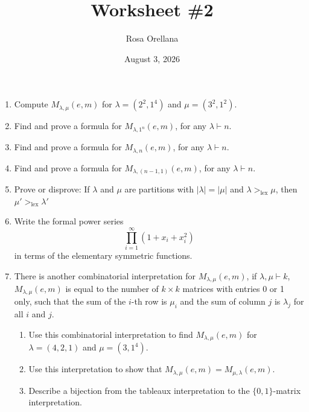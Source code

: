 \documentclass{article}
\title{Worksheet \#2}
\author{Rosa Orellana}
\date{August 3, 2026}
\begin{document}
\maketitle
\begin{enumerate}
\item Compute $M_{\lambda,\mu}(e,m)$ for $\lambda= (2^2,1^4)$ and $\mu=(3^2,1^2)$.

\item Find and prove a formula for $M_{\lambda, 1^n}(e,m)$, for any $\lambda \vdash n$. 

\item Find and prove a formula for $M_{\lambda, n}(e,m)$, for any $\lambda \vdash n$. 

\item Find and prove a formula for $M_{\lambda, (n-1,1)}(e,m)$, for any $\lambda \vdash n$.

\item Prove or disprove: If $\lambda$ and $\mu$ are partitions with $|\lambda|=|\mu|$ and $\lambda>_{\text{lex}} \mu$, then $\mu'>_{\text{lex}} \lambda'$


\item Write the formal power series
\[ \prod_{i=1}^\infty (1+x_i+x_i^2)\]
in terms of the elementary symmetric functions. 

\item There is another combinatorial interpretation for $M_{\lambda, \mu} (e, m)$, if $\lambda, \mu \vdash k$, $M_{\lambda, \mu} (e, m)$ is equal to the number of $k\times k$ matrices with entries 0 or 1 only, such that the sum of the $i$-th row is $\mu_i$ and the sum of column $j$ is $\lambda_j$ for all $i$ and $j$. 
\begin{enumerate}
\item Use this combinatorial interpretation to find $M_{\lambda, \mu}(e, m)$ for $\lambda = (4,2,1)$ and $\mu = (3,1^4)$. 
\item Use this interpretation to show that $M_{\lambda,\mu}(e,m) = M_{\mu,\lambda}(e,m)$.
\item Describe a bijection from the tableaux interpretation to the $\{0,1\}$-matrix interpretation. 
\end{enumerate}



\end{enumerate}
\end{document}
